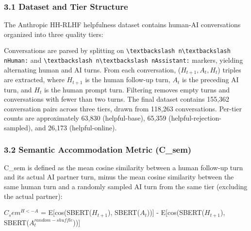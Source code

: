 
\subsubsection{3.1 Dataset and Tier Structure}

The Anthropic HH-RLHF helpfulness dataset \citep{Bai2022Training} contains human-AI conversations organized into three quality tiers:

\begin{table}[htbp]
\centering
{}
\end{table}

Conversations are parsed by splitting on \texttt{\textbackslash textbackslash n\textbackslash textbackslash nHuman:} and \texttt{\textbackslash textbackslash n\textbackslash textbackslash nAssistant:} markers, yielding alternating human and AI turns. From each conversation, ($H_{t+1}, A_t, H_t$) triples are extracted, where $H_{t+1}$ is the human follow-up turn, $A_t$ is the preceding AI turn, and $H_t$ is the human prompt turn. Filtering removes empty turns and conversations with fewer than two turns. The final dataset contains 155,362 conversation pairs across three tiers, drawn from 118,263 conversations. Per-tier counts are approximately 63,830 (helpful-base), 65,359 (helpful-rejection-sampled), and 26,173 (helpful-online).

\subsubsection{3.2 Semantic Accommodation Metric (C\_sem)}

C\_sem is defined as the mean cosine similarity between a human follow-up turn and its actual AI partner turn, minus the mean cosine similarity between the same human turn and a randomly sampled AI turn from the same tier (excluding the actual partner):

$C_sem^{H<-A}$ = E[cos(SBERT($H_{t+1}$), SBERT($A_t$))] - E[cos(SBERT($H_{t+1}$), SBERT($A_t^{random-shuffle}$))]

